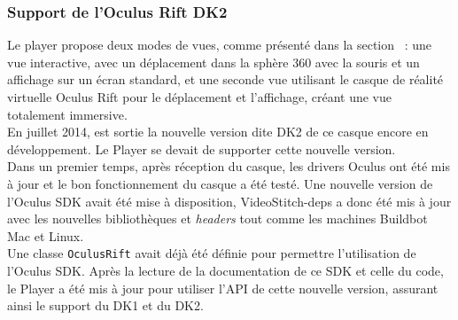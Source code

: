 \subsubsection{Support de l'Oculus Rift DK2}
Le player propose deux modes de vues, comme présenté dans la section ~:
une vue interactive, avec un déplacement dans la sphère 360 avec la souris et un affichage
sur un écran standard, et une seconde vue utilisant le casque de réalité virtuelle 
Oculus Rift pour le déplacement et l'affichage, créant une vue totalement immersive.\\
En juillet 2014\cite{dk2s-now-shipping}, est sortie la nouvelle version dite DK2 de ce casque encore
en développement. Le Player se devait de supporter cette nouvelle version.\\
Dans un premier temps, après réception du casque, les drivers Oculus ont été mis à
jour et le bon fonctionnement du casque a été testé. Une nouvelle version de l'Oculus
SDK avait été mise à disposition, VideoStitch-deps a donc été mis à jour avec les nouvelles
bibliothèques et \textit{headers} tout comme les machines Buildbot Mac et Linux.\\
\newline
Une classe \texttt{OculusRift} avait déjà été définie pour permettre l'utilisation
de l'Oculus SDK. Après la lecture de la documentation de ce SDK et celle du code,
le Player a été mis à jour pour utiliser l'API de cette nouvelle version, assurant
ainsi le support du DK1 et du DK2.

